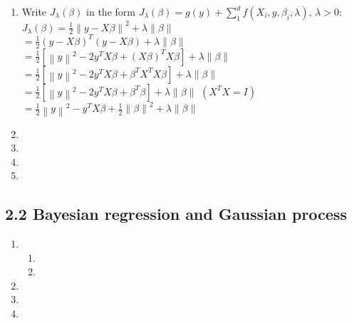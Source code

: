 \documentclass{article}
\newcommand{\norm}[1]{\left\lVert#1\right\rVert}
\begin{document}
\begin{enumerate}
\setlength\itemsep{1em}

\item Write $J_\lambda(\beta)$ in the form $J_\lambda(\beta)=g(y)+\sum_1^df(X_i,y,\beta_i,\lambda)$, $\lambda > 0$: \\
$J_\lambda(\beta)=\frac{1}{2}\norm{y-X\beta}^2+\lambda\norm{\beta}$ \\
$=\frac{1}{2}(y-X\beta)^T(y-X\beta)+\lambda\norm{\beta}$ \\
$=\frac{1}{2}[\norm{y}^2-2y^TX\beta+(X\beta)^TX\beta]+\lambda\norm{\beta}$ \\
$=\frac{1}{2}[\norm{y}^2-2y^TX\beta+\beta^TX^TX\beta]+\lambda\norm{\beta}$ \\
$=\frac{1}{2}[\norm{y}^2-2y^TX\beta+\beta^T\beta]+\lambda\norm{\beta}$ \hfill $(X^TX=I)$ \\
$=\frac{1}{2}\norm{y}^2-y^TX\beta+\frac{1}{2}\norm{\beta}^2+\lambda\norm{\beta}$

\item %

\item %

\item %

\item %

\end{enumerate}
\subsection*{2.2 Bayesian regression and Gaussian process}

\begin{enumerate}
\setlength\itemsep{1em}

\item %

\begin{enumerate}

\item %

\item %

\end{enumerate}

\item %

\item %

\item %

\end{enumerate}
\end{document}
